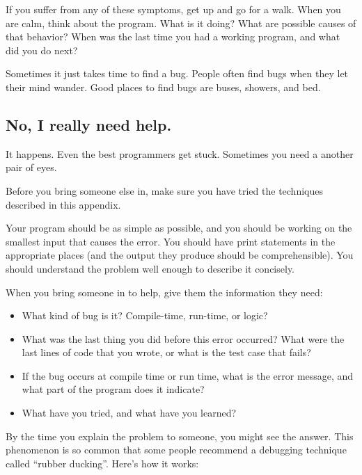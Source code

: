 \documentclass[12pt]{book}
\theoremstyle{exercise}
\begin{document}
If you suffer from any of these symptoms, get up and go for a walk.
When you are calm, think about the program.
What is it doing?
What are possible causes of that behavior?
When was the last time you had a working program, and what did you do next?

Sometimes it just takes time to find a bug.
People often find bugs when they let their mind wander.
Good places to find bugs are buses, showers, and bed.


\subsection*{No, I really need help.}

It happens.
Even the best programmers get stuck.
Sometimes you need a another pair of eyes.

Before you bring someone else in, make sure you have tried the techniques described in this appendix.

Your program should be as simple as possible, and you should be working on the smallest input that causes the error.
You should have print statements in the appropriate places (and the output they produce should be comprehensible).
You should understand the problem well enough to describe it concisely.

When you bring someone in to help, give them the information they need:

\begin{itemize}

\item What kind of bug is it?
Compile-time, run-time, or logic?

\item What was the last thing you did before this error occurred?
What were the last lines of code that you wrote, or what is the test case that fails?

\item If the bug occurs at compile time or run time, what is the error message, and what part of the program does it indicate?

\item What have you tried, and what have you learned?

\end{itemize}

By the time you explain the problem to someone, you might see the answer.
This phenomenon is so common that some people recommend a debugging technique called ``rubber ducking''.
Here's how it works:
\end{document}

